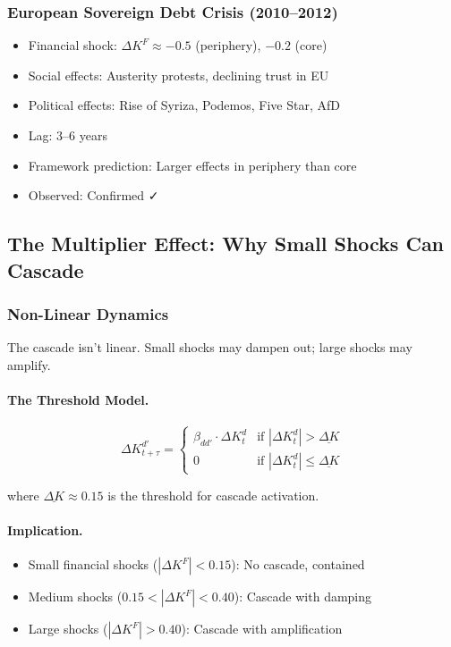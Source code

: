 \subsubsection{European Sovereign Debt Crisis (2010--2012)}

\begin{itemize}
    \item Financial shock: $\Delta K^F \approx -0.5$ (periphery), $-0.2$ (core)
    \item Social effects: Austerity protests, declining trust in EU
    \item Political effects: Rise of Syriza, Podemos, Five Star, AfD
    \item Lag: 3--6 years
    \item Framework prediction: Larger effects in periphery than core
    \item Observed: Confirmed ✓
\end{itemize}

\subsection{The Multiplier Effect: Why Small Shocks Can Cascade}

\subsubsection{Non-Linear Dynamics}

The cascade isn't linear. Small shocks may dampen out; large shocks may amplify.

\paragraph{The Threshold Model.}
\begin{equation}
\Delta K^{d'}_{t+\tau} = \begin{cases}
\beta_{dd'} \cdot \Delta K^d_t & \text{if } |\Delta K^d_t| > \underline{\Delta K} \\
0 & \text{if } |\Delta K^d_t| \leq \underline{\Delta K}
\end{cases}
\end{equation}

where $\underline{\Delta K} \approx 0.15$ is the threshold for cascade activation.

\paragraph{Implication.}
\begin{itemize}
    \item Small financial shocks ($|\Delta K^F| < 0.15$): No cascade, contained
    \item Medium shocks ($0.15 < |\Delta K^F| < 0.40$): Cascade with damping
    \item Large shocks ($|\Delta K^F| > 0.40$): Cascade with amplification
\end{itemize}

